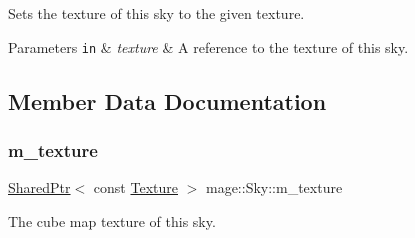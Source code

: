 Sets the texture of this sky to the given texture.


\begin{DoxyParams}[1]{Parameters}
\mbox{\tt in}  & {\em texture} & A reference to the texture of this sky. \\
\hline
\end{DoxyParams}


\subsection{Member Data Documentation}
\hypertarget{structmage_1_1_sky_a4f9e8b3658134a04284174c419390a17}{}\label{structmage_1_1_sky_a4f9e8b3658134a04284174c419390a17} 
\subsubsection{\texorpdfstring{m\+\_\+texture}{m\_texture}}
{\footnotesize\ttfamily \hyperlink{namespacemage_a1e01ae66713838a7a67d30e44c67703e}{Shared\+Ptr}$<$ const \hyperlink{classmage_1_1_texture}{Texture} $>$ mage\+::\+Sky\+::m\+\_\+texture\hspace{0.3cm}{\ttfamily [private]}}

The cube map texture of this sky. 